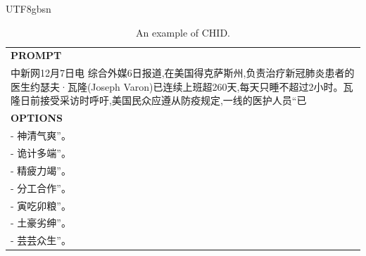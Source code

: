 \documentclass[11pt, a4paper, logo, copyright, nonumbering]{deepseek}
\begin{document}
\begin{CJK*}{UTF8}{gbsn}
\begin{table}[ht]
    \centering \small
\begin{tabular}{p{12cm}}
\toprule
\textbf{PROMPT}\\
中新网12月7日电 综合外媒6日报道,在美国得克萨斯州,负责治疗新冠肺炎患者的医生约瑟夫·瓦隆(Joseph Varon)已连续上班超260天,每天只睡不超过2小时。瓦隆日前接受采访时呼吁,美国民众应遵从防疫规定,一线的医护人员“已\\
\midrule
\textbf{OPTIONS}\\
- 神清气爽”。\\
- 诡计多端”。\\
- 精疲力竭”。\\
- 分工合作”。\\
- 寅吃卯粮”。\\
- 土豪劣绅”。\\
- 芸芸众生”。\\
\bottomrule
\end{tabular}
    \caption{\centering An example of CHID.}
    \label{tab:chid_eval_format_example}
\end{table}


\end{CJK*}
\end{document}
